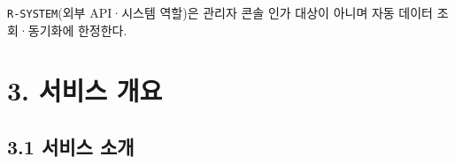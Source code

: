 \documentclass[12pt,a4paper]{article}
\newcommand{\DocNeedspace}[1]{\par\ifdim\dimexpr\pagegoal-\pagetotal\relax<#1\newpage\fi}
\begin{document}
\DocNeedspace{3\baselineskip}
\texttt{R-\allowbreak{}SYSTEM}(외부 API·시스템 역할)은 관리자 콘솔 인가 대상이 아니며 자동 데이터 조회·동기화에 한정한다.


\newpage

\DocNeedspace{10\baselineskip}
\section*{3. 서비스 개요}


\DocNeedspace{8\baselineskip}
\subsection*{3.1 서비스 소개}


\DocNeedspace{32\baselineskip}
\end{document}
